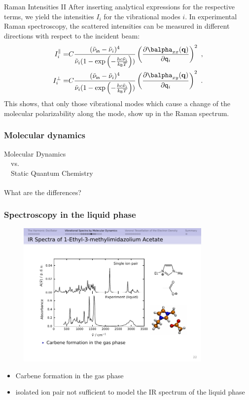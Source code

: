 \documentclass[t]{beamer}
\newcommand{\boltz}{k_{\mathsf{B}}}             %
\begin{document}
	\begin{frame}{Raman Intensities II}
	    After inserting analytical expressions for the respective terms, we yield the intensities $I_i$ for the vibrational modes $i$. In experimental Raman spectroscopy, the scattered intensities can be measured in different directions with respect to the incident beam:
	    \begin{align*}
	        I_i^\parallel = & C \frac{(\tilde{\nu}_\mathsf{in} - \tilde{\nu}_i)^4}{\tilde{\nu}_i (1- \exp\left(-\frac{hc\tilde{\nu}_i}{\boltz T}\right))} \left( \frac{\partial\balpha_{xx}(\mathbf{q})}{\partial \mathsf{q}_i} \right)^2~,  \\
	        I_i^\perp = & C \frac{(\tilde{\nu}_\mathsf{in} - \tilde{\nu}_i)^4}{\tilde{\nu}_i (1- \exp\left(-\frac{hc\tilde{\nu}_i}{\boltz T}\right))} \left( \frac{\partial\balpha_{xy}(\mathbf{q})}{\partial \mathsf{q}_i} \right)^2~.
	    \end{align*}
	    This shows, that only those vibrational modes which cause a change of the molecular polarizability along the mode, show up in the Raman spectrum.
	\end{frame}
	\begin{frame}[plain,c]
	    \frametitle{Molecular dynamics}
	    \centering \Large
	    Molecular Dynamics \\~\ vs. \\~\ Static Quantum Chemistry \\~\\
	    What are the differences?
	\end{frame}
	\begin{frame}
	    \frametitle{Spectroscopy in the liquid phase}
	    \begin{figure}
            \includegraphics[width=0.85\textwidth]{figures/emimoac_ir.pdf}
        \end{figure}
        
        \begin{itemize}
            \item Carbene formation in the gas phase
            \item isolated ion pair not sufficient to model the IR spectrum of the liquid phase
        \end{itemize}
	\end{frame}
\end{document}
